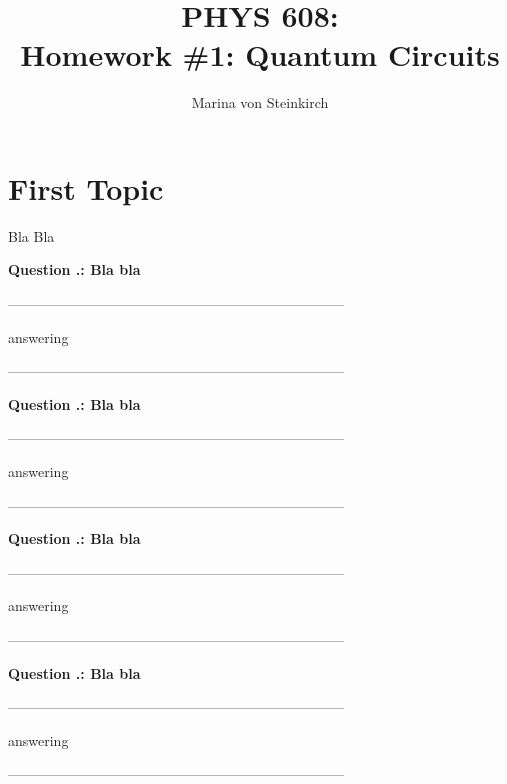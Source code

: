 \documentclass[12pt]{article}
\author{Marina von Steinkirch}
\title{PHYS 608:\\ Homework \#1: Quantum Circuits}
\newcounter{question}[section]
\newcommand{\question}[2] {\vspace{.25in} \fbox{#1} #2 \vspace{.10in}}
\begin{document}
\maketitle





\section{First Topic} %


Bla Bla





\vspace{0.5cm}
{\bf Question .:
Bla bla
  } 


\vspace{1cm}


------------------------------------------------------------------------

answering

------------------------------------------------------------------------


\vspace{0.5cm}
{\bf Question .:
Bla bla
  } 


\vspace{1cm}


------------------------------------------------------------------------

answering

------------------------------------------------------------------------





\vspace{0.5cm}
{\bf Question .:
Bla bla
  } 


\vspace{1cm}


------------------------------------------------------------------------

answering

------------------------------------------------------------------------




\vspace{0.5cm}
{\bf Question .:
Bla bla
  } 


\vspace{1cm}


------------------------------------------------------------------------

answering

------------------------------------------------------------------------
\end{document}
